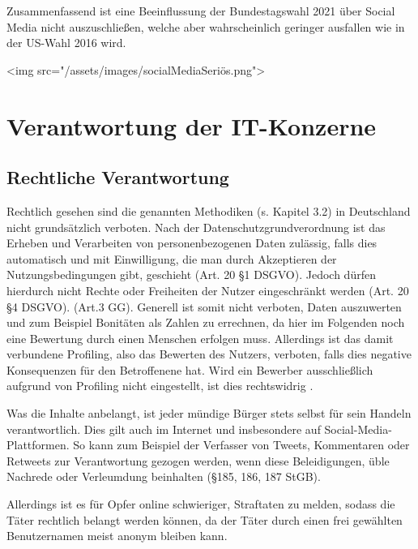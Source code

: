 Zusammenfassend ist eine Beeinflussung der Bundestagswahl 2021 über Social Media nicht auszuschließen, welche aber wahrscheinlich geringer ausfallen wie in der US-Wahl 2016 wird.

<img src="/assets/images/socialMediaSeriös.png">

\section{Verantwortung der IT-Konzerne}

\subsection{Rechtliche Verantwortung}
Rechtlich gesehen sind die genannten Methodiken (s. Kapitel 3.2) in Deutschland nicht grundsätzlich verboten. Nach der Datenschutzgrundverordnung ist das Erheben und Verarbeiten von personenbezogenen Daten zulässig, falls dies automatisch und mit Einwilligung, die man durch Akzeptieren der Nutzungsbedingungen gibt, geschieht (Art. 20 \S 1 DSGVO). Jedoch dürfen hierdurch nicht Rechte oder Freiheiten der Nutzer eingeschränkt werden (Art. 20 \S 4 DSGVO).  (Art.3 GG). Generell ist somit nicht verboten, Daten auszuwerten und zum Beispiel Bonitäten als Zahlen zu errechnen, da hier im Folgenden noch eine Bewertung durch einen Menschen erfolgen muss\autocite[vgl.][7]{martini2017algorithmen}. Allerdings ist das damit verbundene Profiling, also das Bewerten des Nutzers, verboten, falls dies negative Konsequenzen für den Betroffenene hat. Wird ein Bewerber ausschließlich aufgrund von Profiling nicht eingestellt, ist dies rechtswidrig \autocite[vgl.][9]{martini2014big}.

Was die Inhalte anbelangt, ist jeder mündige Bürger stets selbst für sein Handeln verantwortlich. Dies gilt auch im Internet und insbesondere auf Social-Media-Plattformen. So kann zum Beispiel der Verfasser von Tweets, Kommentaren oder Retweets zur Verantwortung gezogen werden, wenn diese Beleidigungen, üble Nachrede oder Verleumdung beinhalten (\S 185, 186, 187 StGB).

Allerdings ist es für Opfer online schwieriger, Straftaten zu melden, sodass die Täter rechtlich belangt werden können, da der Täter durch einen frei gewählten Benutzernamen meist anonym bleiben kann.

